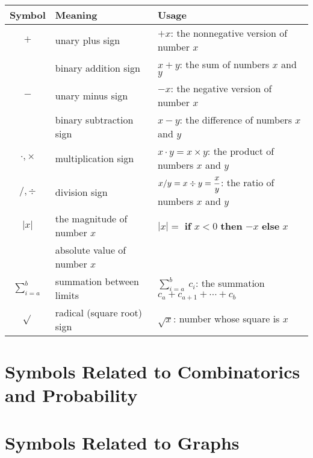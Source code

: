 \begin{tabular}{c|l|l}
{\bf Symbol} & {\bf Meaning} & {\bf Usage} \\ \hline
\hline
$+$
  & unary plus sign
  & $+x$: the nonnegative version of number $x$ \\ \hline
  & binary addition sign 
  & $x+y$: the sum of numbers $x$ and $y$ \\ \hline
$-$
  & unary minus sign
  & $-x$: the negative version of number $x$ \\ \hline
  & binary subtraction sign 
  & $x-y$: the difference of numbers $x$ and $y$ \\ \hline
$\cdot, \times$
  & multiplication sign 
  & $x \cdot y = x \times y$: the product of numbers $x$ and $y$ \\ \hline
$/, \div$
  & division sign 
  & $x / y = x \div y = {\displaystyle {x \over y}}$: the ratio of numbers $x$ and $y$ \\ \hline
$|x|$
  & the magnitude of number $x$
  & $|x| =$ {\bf if} $x<0$ {\bf then} $-x$ {\bf else} $x$ \\
  & absolute value of number $x$ &  \\ \hline
$\sum_{i=a}^b$
  & summation between limits
  & $\sum_{i=a}^b \ c_i$: the summation $c_a + c_{a+1} + \cdots + c_b$ \\ \hline
$\sqrt{}$
  & radical (square root) sign
  & $\sqrt{x}$: number whose square is $x$
\end{tabular}

\section*{Symbols Related to Combinatorics and Probability}

\section*{Symbols Related to Graphs}
